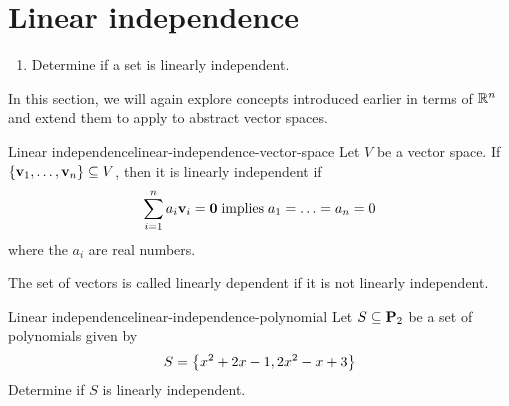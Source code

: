 \section{Linear independence}

\begin{outcome}
  \begin{enumerate}
  \item Determine if a set is linearly independent.
  \end{enumerate}
\end{outcome}

In this section, we will again explore concepts introduced earlier in terms of $\mathbb{R}^n$ and extend them to apply to abstract vector spaces.

\begin{definition}{Linear independence}{linear-independence-vector-space}
Let $V$ be a vector space. If $\left\{\mbox{\bf v}_{1},\ldots,\mbox{\bf v}_{n}\right\} \subseteq V$, then it is linearly independent
 if
\begin{equation*}
\sum_{i=1}^{n}a_{i}\mbox{\bf v}_{i}=\mbox{\bf 0} \;\mbox{implies}\;
a_{1}=\ldots =a_{n}=0
\end{equation*}
where the $a_i$ are real numbers.
\end{definition}

The
set of vectors is called linearly dependent if it is not linearly independent.

\begin{example}{Linear independence}{linear-independence-polynomial}
Let $S \subseteq \mathbf{P}_2$ be a set of polynomials given by
\[
S = \left\{x^2 + 2x - 1, 2x^2 - x + 3 \right\}
\]
Determine if $S$ is linearly independent.
\end{example}

